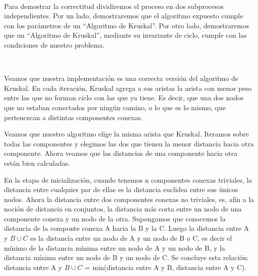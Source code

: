 \documentclass[11pt, a4paper, twoside]{article}
\begin{document}
{}

\begin{paragraph}\

Para demostrar la correctitud dividiremos el proceso en dos subprocesos
independientes. Por un lado, demostraremos que el algoritmo expuesto cumple
con los parámetros de un ``Algoritmo de Kruskal''. Por otro lado,
demostraremos que un ``Algoritmo de Kruskal'', mediante su invariante de
ciclo, cumple con las condiciones de nuestro problema.

\end{paragraph}

\begin{paragraph}\


Veamos que nuestra implementación es una correcta versión del algoritmo de
Kruskal. En cada iteración, Kruskal agrega a sus aristas la arista con menor
peso entre las que no forman ciclo con las que ya tiene. Es decir, que una dos
nodos que no estaban conectados por ningún camino, o lo que es lo mismo, que
pertenezcan a distintas componentes conexas.

Veamos que nuestro algoritmo elige la misma arista que Kruskal. Iteramos sobre
todas las componentes y elegimos las dos que tienen la menor distancia hacia
otra componente. Ahora veamos que las distancias de una componente hacia otra
están bien calculadas.

En la etapa de inicialización, cuando tenemos n componentes conexas triviales,
la distancia entre cualquier par de ellas es la distancia euclidea entre sus
únicos nodos. Ahora la distancia entre dos componentes conexas no triviales,
es, afín a la noción de distancia en conjuntos, la distancia más corta entre
un nodo de una componente conexa y un nodo de la otra. Supongamos que
conocemos la distancia de la componte conexa A hacia la B y la C. Luego la
distancia entre A y $B \cup C$ es la distancia entre un nodo de A y un nodo de
B o C, es decir el mínimo de la distancia mínima entre un nodo de A y un nodo
de B, y la distancia mínima entre un nodo de B y un nodo de C. Se concluye
esta relación: distancia entre A y $B \cup C$ = min(distancia entre A y B,
distancia entre A y C).

\end{paragraph}
\end{document}
